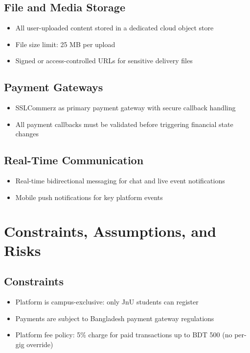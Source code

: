 \documentclass[a4paper,12pt]{article}
\begin{document}
\subsection{File and Media Storage}
\begin{itemize}
    \item All user-uploaded content stored in a dedicated cloud object store
    \item File size limit: 25 MB per upload
    \item Signed or access-controlled URLs for sensitive delivery files
\end{itemize}

\subsection{Payment Gateways}
\begin{itemize}
    \item SSLCommerz as primary payment gateway with secure callback handling
    \item All payment callbacks must be validated before triggering financial state changes
\end{itemize}

\subsection{Real-Time Communication}
\begin{itemize}
    \item Real-time bidirectional messaging for chat and live event notifications
    \item Mobile push notifications for key platform events
\end{itemize}

\section{Constraints, Assumptions, and Risks}

\subsection{Constraints}
\begin{itemize}
    \item Platform is campus-exclusive: only JnU students can register
    \item Payments are subject to Bangladesh payment gateway regulations
    \item Platform fee policy: 5\% charge for paid transactions up to BDT 500 (no per-gig override)
\end{itemize}
\end{document}
